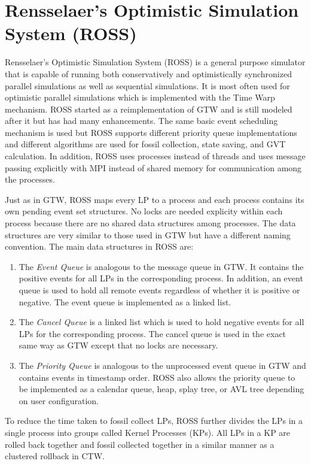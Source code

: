 \documentclass[11pt]{book}
\begin{document}
\section{Rensselaer's Optimistic Simulation System (ROSS)}

Rensselaer's Optimistic Simulation System \cite{carothers-00} (ROSS) is a general purpose simulator
that is capable of running both conservatively and optimistically synchronized parallel simulations
as well as sequential simulations.  It is most often used for optimistic parallel simulations which
is implemented with the Time Warp mechanism.  ROSS started as a reimplementation of GTW and is still
modeled after it but has had many enhancements.  The same basic event scheduling mechanism is used
but ROSS supports different priority queue implementations and different algorithms are used for
fossil collection, state saving, and GVT calculation.  In addition, ROSS uses processes instead of
threads and uses message passing explicitly with MPI instead of shared memory for communication
among the processes.

Just as in GTW, ROSS maps every LP to a process and each process contains its own pending event set
structures.  No locks are needed explicity within each process because there are no shared data
structures among processes.  The data structures are very similar to those used in GTW but have a
different naming convention.  The main data structures in ROSS are:

\begin{enumerate}
\item The \emph{Event Queue} is analogous to the message queue in GTW.  It contains the positive
  events for all LPs in the corresponding process.  In addition, an event queue is used to hold all
  remote events regardless of whether it is positive or negative.  The event queue is implemented as
  a linked list.
\item The \emph{Cancel Queue} is a linked list which is used to hold negative events for all LPs for
  the corresponding process.  The cancel queue is used in the exact same way as GTW except that no
  locks are necessary.
\item The \emph{Priority Queue} is analogous to the unprocessed event queue in GTW and contains
  events in timestamp order.  ROSS also allows the priority queue to be implemented as a calendar
  queue, heap, splay tree, or AVL tree depending on user configuration.
\end{enumerate}

To reduce the time taken to fossil collect LPs, ROSS further divides the LPs in a single process
into groups called Kernel Processes (KPs).  All LPs in a KP are rolled back together and fossil
collected together in a similar manner as a clustered rollback in CTW.
\end{document}
